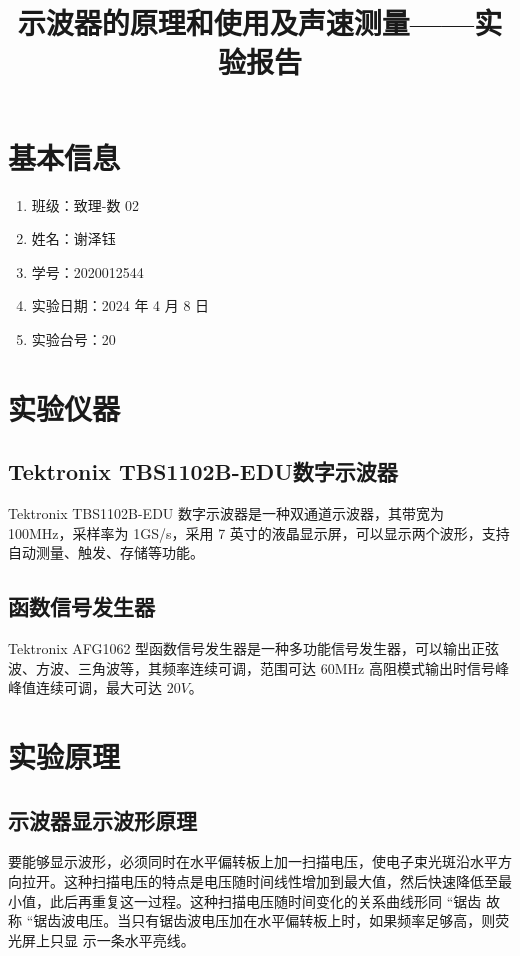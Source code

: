 \documentclass[12pt,a4paper]{amsart}
\title{示波器的原理和使用及声速测量——实验报告}
\begin{document}
\maketitle

\section{基本信息}

\begin{enumerate}
  \item 班级：致理-数 02
  \item 姓名：谢泽钰
  \item 学号：2020012544
  \item 实验日期：2024 年 4 月 8 日
  \item 实验台号：20
\end{enumerate}


\section{实验仪器}

\subsection{Tektronix TBS1102B-EDU数字示波器}

Tektronix TBS1102B-EDU 数字示波器是一种双通道示波器，其带宽为 100MHz，采样率为 1GS/s，采用 7 英寸的液晶显示屏，可以显示两个波形，支持自动测量、触发、存储等功能。

\subsection{函数信号发生器}

Tektronix AFG1062 型函数信号发生器是一种多功能信号发生器，可以输出正弦波、方波、三角波等，其频率连续可调，范围可达 60MHz 高阻模式输出时信号峰峰值连续可调，最大可达 $20V$。

\section{实验原理}

\subsection{示波器显示波形原理}

要能够显示波形，必须同时在水平偏转板上加一扫描电压，使电子束光斑沿水平方向拉开。这种扫描电压的特点是电压随时间线性增加到最大值，然后快速降低至最小值，此后再重复这一过程。这种扫描电压随时间变化的关系曲线形同 “锯齿 故称 “锯齿波电压。当只有锯齿波电压加在水平偏转板上时，如果频率足够高，则荧光屏上只显
示一条水平亮线。\\
\end{document}
